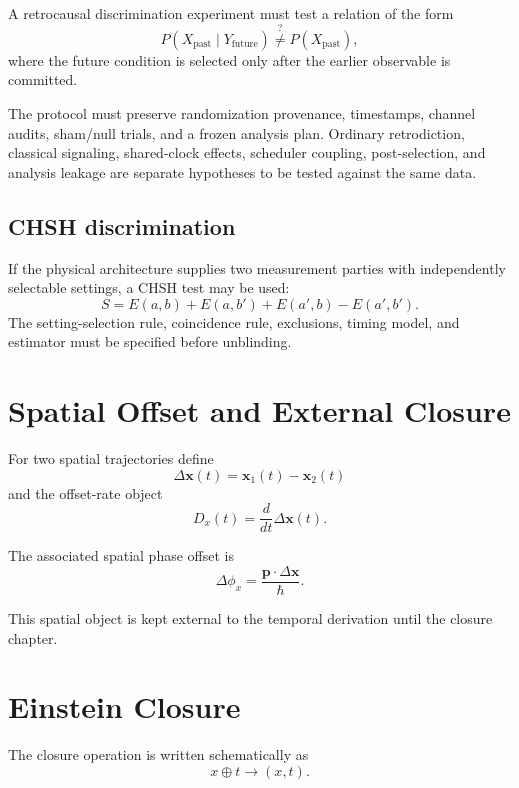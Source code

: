 \documentclass[11pt,a4paper]{book}
\begin{document}
A retrocausal discrimination experiment must test a relation of the form
\begin{equation}
P(X_{\mathrm{past}}\mid Y_{\mathrm{future}})
\stackrel{?}{\neq}
P(X_{\mathrm{past}}),
\end{equation}
where the future condition is selected only after the earlier observable is committed.

The protocol must preserve randomization provenance, timestamps, channel audits, sham/null trials, and a frozen analysis plan. Ordinary retrodiction, classical signaling, shared-clock effects, scheduler coupling, post-selection, and analysis leakage are separate hypotheses to be tested against the same data.

\section{CHSH discrimination}
If the physical architecture supplies two measurement parties with independently selectable settings, a CHSH test may be used:
\begin{equation}
S=E(a,b)+E(a,b')+E(a',b)-E(a',b').
\end{equation}
The setting-selection rule, coincidence rule, exclusions, timing model, and estimator must be specified before unblinding.

\chapter{Spatial Offset and External Closure}
For two spatial trajectories define
\begin{equation}
\Delta\mathbf x(t)=\mathbf x_1(t)-\mathbf x_2(t)
\end{equation}
and the offset-rate object
\begin{equation}
D_x(t)=\frac{d}{dt}\Delta\mathbf x(t).
\end{equation}

The associated spatial phase offset is
\begin{equation}
\Delta\phi_x=
\frac{\mathbf p\cdot\Delta\mathbf x}{\hbar}.
\end{equation}

This spatial object is kept external to the temporal derivation until the closure chapter.

\chapter{Einstein Closure}
The closure operation is written schematically as
\begin{equation}
x\oplus t\longrightarrow(x,t).
\end{equation}
\end{document}
